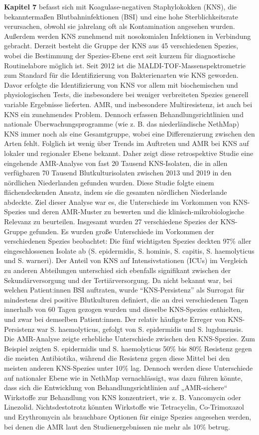 \documentclass[
]{book}
\begin{document}
\textbf{Kapitel 7} befasst sich mit Koagulase-negativen Staphylokokken (KNS), die bekanntermaßen Blutbahninfektionen (BSI) und eine hohe Sterblichkeitsrate verursachen, obwohl sie jahrelang oft als Kontamination angesehen wurden. Außerdem werden KNS zunehmend mit nosokomialen Infektionen in Verbindung gebracht. Derzeit besteht die Gruppe der KNS aus 45 verschiedenen Spezies, wobei die Bestimmung der Spezies-Ebene erst seit kurzem für diagnostische Routinelabore möglich ist. Seit 2012 ist die MALDI-TOF-Massenspektrometrie zum Standard für die Identifizierung von Bakterienarten wie KNS geworden. Davor erfolgte die Identifizierung von KNS vor allem mit biochemischen und physiologischen Tests, die insbesondere bei weniger verbreiteten Spezies generell variable Ergebnisse lieferten. AMR, und insbesondere Multiresistenz, ist auch bei KNS ein zunehmendes Problem. Dennoch erfassen Behandlungsrichtlinien und nationale Überwachungsprogramme (wie z. B. das niederländische NethMap) KNS immer noch als eine Gesamtgruppe, wobei eine Differenzierung zwischen den Arten fehlt. Folglich ist wenig über Trends im Auftreten und AMR bei KNS auf lokaler und regionaler Ebene bekannt. Daher zeigt diese retrospektive Studie eine eingehende AMR-Analyse von fast 20 Tausend KNS-Isolaten, die in allen verfügbaren 70 Tausend Blutkulturisolaten zwischen 2013 und 2019 in den nördlichen Niederlanden gefunden wurden. Diese Studie folgte einem flächendeckenden Ansatz, indem sie die gesamten nördlichen Niederlande abdeckte. Ziel dieser Analyse war es, die Unterschiede im Vorkommen von KNS-Spezies und deren AMR-Muster zu bewerten und die klinisch-mikrobiologische Relevanz zu beurteilen. Insgesamt wurden 27 verschiedene Spezies der KNS-Gruppe gefunden. Es wurden große Unterschiede im Vorkommen der verschiedenen Spezies beobachtet: Die fünf wichtigsten Spezies deckten 97\% aller eingeschlossenen Isolate ab (S. epidermidis, S. hominis, S. capitis, S. haemolyticus und S. warneri). Der Anteil von KNS auf Intensivstationen (ICUs) im Vergleich zu anderen Abteilungen unterschied sich ebenfalls signifikant zwischen der Sekundärversorgung und der Tertiärversorgung. Da nicht bekannt war, bei welchen Patient:innen BSI auftraten, wurde ``KNS-Persistenz'' als Surrogat für mindestens drei positive Blutkulturen definiert, die an drei verschiedenen Tagen innerhalb von 60 Tagen gezogen wurden und dieselbe KNS-Spezies enthielten, und zwar bei demselben Patient:innen. Der relativ häufigste Erreger von KNS-Persistenz war S. haemolyticus, gefolgt von S. epidermidis und S. lugdunensis. Die AMR-Analyse zeigte erhebliche Unterschiede zwischen den KNS-Spezies. Zum Beispiel zeigten S. epidermidis und S. haemolyticus 50\% bis 80\% Resistenz gegen die meisten Antibiotika, während die Resistenz gegen diese Mittel bei den meisten anderen KNS-Spezies unter 10\% lag. Dennoch werden diese Unterschiede auf nationaler Ebene wie in NethMap vernachlässigt, was dazu führen könnte, dass sich die Entwicklung von Behandlungsrichtlinien auf „AMR-sichere`` Wirkstoffe zur Behandlung von KNS konzentriert, wie z. B. Vancomycin oder Linezolid. Nichtsdestotrotz könnten Wirkstoffe wie Tetracyclin, Co-Trimoxazol und Erythromycin als brauchbare Optionen für einige Spezies angesehen werden, bei denen die AMR laut den Studienergebnissen nie mehr als 10\% betrug. 
\end{document}
